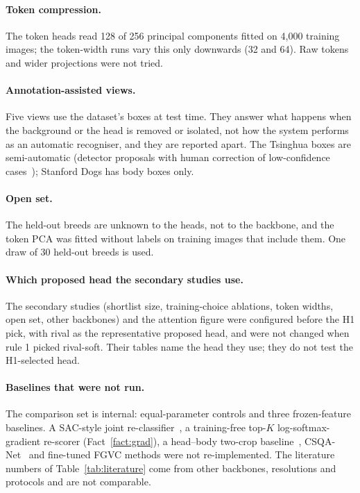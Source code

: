 \documentclass[11pt,a4paper]{article}
\theoremstyle{plain}
\begin{document}
\paragraph{Token compression.} The token heads read 128 of 256 principal components fitted on 4,000 training images;
the token-width runs vary this only downwards (32 and 64). Raw tokens and wider projections were not tried.

\paragraph{Annotation-assisted views.} Five views use the dataset's boxes at test time. They answer what happens
when the background or the head is removed or isolated, not how the system performs as an automatic recogniser, and
they are reported apart. The Tsinghua boxes are semi-automatic (detector proposals with human correction of
low-confidence cases~\citep{zou2020tsinghuadogs}); Stanford Dogs has body boxes only.

\paragraph{Open set.} The held-out breeds are unknown to the heads, not to the backbone, and the token PCA was fitted
without labels on training images that include them. One draw of 30 held-out breeds is used.

\paragraph{Which proposed head the secondary studies use.} The secondary studies (shortlist size, training-choice
ablations, token widths, open set, other backbones) and the attention figure were configured before the H1 pick, with
rival as the representative proposed head, and were not changed when rule 1 picked rival-soft. Their tables name the
head they use; they do not test the H1-selected head.

\paragraph{Baselines that were not run.} The comparison set is internal: equal-parameter controls and three frozen-feature
baselines. A SAC-style joint re-classifier~\citep{do2024sac}, a training-free top-$K$ log-softmax-gradient
re-scorer (Fact~\ref{fact:grad}), a head--body two-crop baseline~\citep{khan2025headbody}, CSQA-Net~\citep{xu2026csqanet}
and fine-tuned FGVC methods were not re-implemented. The literature numbers of Table~\ref{tab:literature} come from
other backbones, resolutions and protocols and are not comparable.
\end{document}
